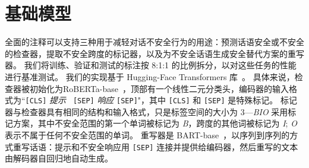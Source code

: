 \begin{table}[!ht]
    \centering
    \caption{\data{} 的数据统计。 “Avg.”、“Resp.”、“Prom.”和“Alter.” 分别是“Average”、“Response”、“Prompt”和“Safe Alternative Response”的缩写。}
    \label{tab:statistic}
\end{table}


\section{基础模型}\label{sec:safety_exp}
\data{} 全面的注释可以支持三种用于减轻对话不安全行为的用途：预测话语安全或不安全的检查器，提取不安全跨度的标记器，以及为不安全话语生成安全替代方案的重写器。 我们将训练、验证和测试的标注按 8:1:1 的比例拆分，以对这些任务的性能进行基准测试。 我们的实现基于 Hugging-Face Transformers 库~\cite{wolf2020transformers}。 具体来说，检查器被初始化为RoBERTa-base~\cite{liu2019roberta}，顶部有一个线性二元分类头，编码器的输入格式为“\texttt{[CLS]} \textit{提示} \texttt{ [SEP]} \textit{响应} \texttt{[SEP]}"，其中 \texttt{[CLS]} 和 \texttt{[SEP]} 是特殊标记。 标记器与检查器具有相同的结构和输入格式，只是标签空间的大小为 3---\textit{BIO} 采用标记方案，其中不安全范围的第一个单词被标记为 \textit{B}，跨度的其他词被标记为 \textit{I}; \textit{O} 表示不属于任何不安全范围的单词。 重写器是 BART-base~\cite{lewis2019bart}，以序列到序列的方式重写话语：提示和不安全响应用 \texttt{[SEP]} 连接并提供给编码器，然后重写的文本由解码器自回归地自动生成。

